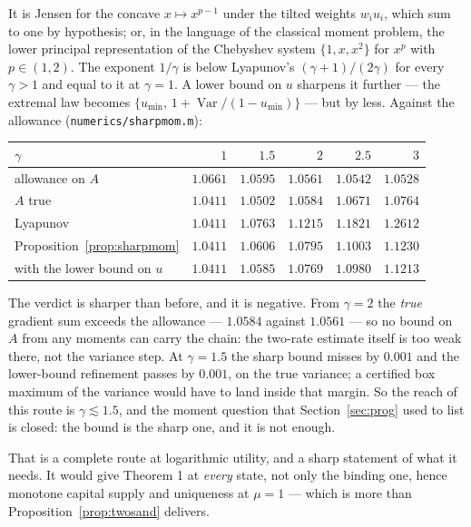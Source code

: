 It is Jensen for the concave $x\mapsto x^{p-1}$ under the tilted weights $w_iu_i$, which sum to one
by hypothesis; or, in the language of the classical moment problem, the lower principal representation
of the Chebyshev system $\{1,x,x^2\}$ for $x^p$ with $p\in(1,2)$. The exponent $1/\gamma$ is below
Lyapunov's $(\gamma+1)/(2\gamma)$ for every $\gamma>1$ and equal to it at $\gamma=1$. A lower bound
on $u$ sharpens it further --- the extremal law becomes $\{u_{\min},\,1+\operatorname{Var}/(1-u_{\min})\}$
--- but by less. Against the allowance (\texttt{numerics/sharpmom.m}):

\begin{center}
\begin{tabular}{lrrrrr}
\toprule
$\gamma$ & $1$ & $1.5$ & $2$ & $2.5$ & $3$\\
\midrule
allowance on $A$ & $1.0661$ & $1.0595$ & $1.0561$ & $1.0542$ & $1.0528$\\
$A$ true & $1.0411$ & $1.0502$ & $1.0584$ & $1.0671$ & $1.0764$\\
Lyapunov & $1.0411$ & $1.0763$ & $1.1215$ & $1.1821$ & $1.2612$\\
Proposition~\ref{prop:sharpmom} & $1.0411$ & $1.0606$ & $1.0795$ & $1.1003$ & $1.1230$\\
with the lower bound on $u$ & $1.0411$ & $1.0585$ & $1.0769$ & $1.0980$ & $1.1213$\\
\bottomrule
\end{tabular}
\end{center}

The verdict is sharper than before, and it is negative. From $\gamma=2$ the \emph{true} gradient sum
exceeds the allowance --- $1.0584$ against $1.0561$ --- so no bound on $A$ from any moments can carry
the chain: the two-rate estimate itself is too weak there, not the variance step. At $\gamma=1.5$ the
sharp bound misses by $0.001$ and the lower-bound refinement passes by $0.001$, on the true variance;
a certified box maximum of the variance would have to land inside that margin. So the reach of this
route is $\gamma\lesssim1.5$, and the moment question that Section~\ref{sec:prog} used to list is
closed: the bound is the sharp one, and it is not enough.

That is a complete route at logarithmic utility, and a sharp statement of what it needs. It would give
Theorem 1 at \emph{every} state, not only the binding one, hence monotone capital supply and
uniqueness at $\mu=1$ --- which is more than Proposition~\ref{prop:twosand} delivers.

